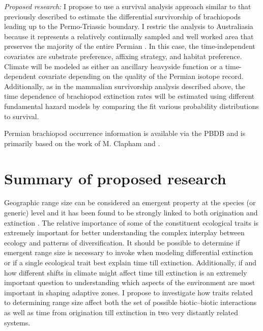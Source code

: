 \documentclass[12pt,letterpaper]{article}
\begin{document}
\textit{Proposed research:}
I propose to use a survival analysis approach similar to that previously described to estimate the differential survivorship of brachiopods leading up to the Permo-Triassic boundary. I restric the analysis to Australiasia because it represents a relatively continually sampled and well worked area that preserves the majority of the entire Permian \citep{Clapham2012,Clapham2008a,Waterhouse1987,Archbold1995}. In this case, the time-independent covariates are substrate preference, affixing strategy, and habitat preference. Climate will be modeled as either an ancillary heavyside function or a time-dependent covariate depending on the quality of the Permian isotope record. Additionally, as in the mammalian survivorship analysis described above, the time dependence of brachiopod extinction rates will be estimated using different fundamental hazard models by comparing the fit various probability distributions to survival.

Permian brachiopod occurrence information is available via the PBDB and is primarily based on the work of M. Clapham \citep{Clapham2006,Clapham2008a,Clapham2007a,Clapham2012,Clapham2007} and \citet{Waterhouse1987}.


\section{Summary of proposed research}
Geographic range size can be considered an emergent property at the species (or generic) level and it has been found to be strongly linked to both origination and extinction \citep{Roy2009c,Jablonski2003,Jablonski2006a}. The relative importance of some of the constituent ecological traits is extremely important for better understanding the complex interplay between ecology and patterns of diversification. It should be possible to determine if emergent range size is necessary to invoke when modeling differential extinction or if a single ecological trait best explain time till extinction. Additionally, if and how different shifts in climate might affect time till extinction is an extremely important question to understanding which aspects of the environment are most important in shaping adaptive zones. I propose to investigate how traits related to determining range size affect both the set of possible biotic--biotic interactions as well as time from origination till extinction in two very distantly related systems.
\end{document}
